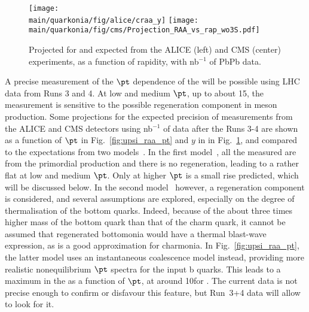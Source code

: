 \documentclass[../report.tex]{subfiles}
\providecommand{\main}{..}
\begin{document}
\begin{figure}
\begin{center}
 \texttt{[image: \\main/quarkonia/fig/alice/craa\_y]}
 \texttt{[image: \\main/quarkonia/fig/cms/Projection\_RAA\_vs\_rap\_wo3S.pdf]}
\end{center}

 \caption{Projected \raa for \PgUa and \PgUb expected from the ALICE (left) and CMS (center) experiments, as a function of rapidity, with \unit[10]{nb}$^{-1}$ of PbPb data.
 }
 \label{fig:upsi_raa_y}
\end{figure}


A precise measurement of the $\pt$ dependence of the  \raa will be possible using LHC data from Runs 3 and 4. At low and medium $\pt$, up to about 15\UGeV, the measurement is
sensitive to the possible regeneration component in \PGU meson production. Some projections for the expected precision of \PGU measurements from the ALICE and CMS detectors
using \unit[10]{nb}$^{-1}$ of data after the Runs 3-4 are shown as a function of $\pt$ in Fig.~\ref{fig:upsi_raa_pt} and $y$ in in Fig.~\ref{fig:upsi_raa_y}, and compared to the expectations from two 
models~\cite{Krouppa:2017jlg,Du:2017qkv}. In the first model~\cite{Krouppa:2017jlg}, all the measured \PGU are from the primordial production and there is no regeneration, leading
to a rather flat \raa at low and medium $\pt$. Only at higher $\pt$ is a small rise predicted, which will be discussed below. In the second model~\cite{Du:2017qkv} however, a regeneration
component is considered, and several assumptions are explored, especially on the degree of thermalisation of the bottom quarks. Indeed, because of the about three times higher mass of
the bottom quark than that of the charm quark, it cannot be assumed that regenerated bottomonia would have a thermal blast-wave expression, as is a good approximation for charmonia.
In Fig.~\ref{fig:upsi_raa_pt}, the latter model uses an instantaneous coalescence model instead, providing more realistic nonequilibrium $\pt$ spectra for the input b quarks. 
This leads to a maximum in the \raa as a function of $\pt$, at around 10\UGeV for . The current data is not precise enough to confirm or disfavour this feature, but Run~3+4 
data will allow to look for it.
\end{document}
